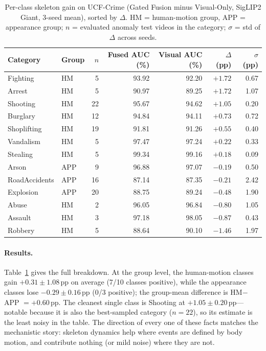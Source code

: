 \begin{table}[t]
\centering
\caption{Per-class skeleton gain on UCF-Crime (Gated Fusion minus
Visual-Only, SigLIP2 Giant, 3-seed mean), sorted by $\Delta$. HM =
human-motion group, APP = appearance group; $n$ = evaluated anomaly test
videos in the category; $\sigma$ = std of $\Delta$ across seeds.}
\label{tab:appb-pri7}
\begin{tabular}{llrrrrr}
\toprule
Category & Group & $n$ & Fused AUC (\%) & Visual AUC (\%) & $\Delta$ (pp) & $\sigma$ (pp) \\
\midrule
Fighting      & HM  & 5  & 93.92 & 92.20 & $+1.72$ & 0.67 \\
Arrest        & HM  & 5  & 90.97 & 89.25 & $+1.72$ & 1.07 \\
Shooting      & HM  & 22 & 95.67 & 94.62 & $+1.05$ & 0.20 \\
Burglary      & HM  & 12 & 94.84 & 94.11 & $+0.73$ & 0.72 \\
Shoplifting   & HM  & 19 & 91.81 & 91.26 & $+0.55$ & 0.40 \\
Vandalism     & HM  & 5  & 97.47 & 97.24 & $+0.22$ & 0.33 \\
Stealing      & HM  & 5  & 99.34 & 99.16 & $+0.18$ & 0.09 \\
Arson         & APP & 9  & 96.88 & 97.07 & $-0.19$ & 0.50 \\
RoadAccidents & APP & 16 & 87.14 & 87.35 & $-0.21$ & 2.42 \\
Explosion     & APP & 20 & 88.75 & 89.24 & $-0.48$ & 1.90 \\
Abuse         & HM  & 2  & 96.05 & 96.84 & $-0.80$ & 1.05 \\
Assault       & HM  & 3  & 97.18 & 98.05 & $-0.87$ & 0.43 \\
Robbery       & HM  & 5  & 88.64 & 90.10 & $-1.46$ & 1.97 \\
\bottomrule
\end{tabular}
\end{table}

\paragraph{Results.} Table~\ref{tab:appb-pri7} gives the full breakdown. At
the group level, the human-motion classes gain $+0.31\pm1.08$\,pp on average
(7/10 classes positive), while the appearance classes lose
$-0.29\pm0.16$\,pp (0/3 positive); the group-mean difference is
HM$-$APP $= +0.60$\,pp. The cleanest single class is Shooting at
$+1.05\pm0.20$\,pp---notable because it is also the best-sampled category
($n=22$), so its estimate is the least noisy in the table. The direction of
every one of these facts matches the mechanistic story: skeleton dynamics
help where events are defined by body motion, and contribute nothing (or
mild noise) where they are not.

